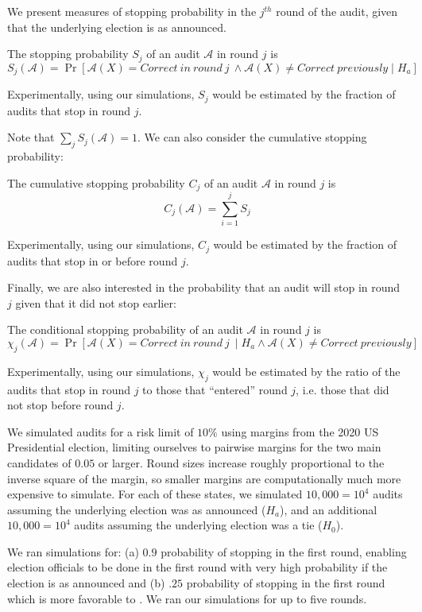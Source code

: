 We present measures of stopping probability in the $j^{th}$ round of the audit, given that the underlying election is as announced.
\begin{definition}
The stopping probability $S_j$ of an audit $\mathcal{A}$ in round $j$ is 
$$S_j(\mathcal{A})=\Pr[\mathcal{A}(X)=Correct ~in~round~j~\land \mathcal{A}(X) \neq Correct ~previously \mid H_a]$$
\end{definition}
Experimentally, using our simulations, $S_j$ would be estimated by the fraction of audits that stop in round $j$. 

Note that $\sum _j S_j(\mathcal{A})=1$. We can also consider the cumulative stopping probability: 
\begin{definition}
The cumulative stopping probability $C_j$ of an audit $\mathcal{A}$ in round $j$ is 
$$C_j(\mathcal{A})= \sum_{i=1}^j S_j$$
\end{definition}
Experimentally, using our simulations, $C_j$ would be estimated by the fraction of audits that stop in or before round $j$. 

Finally, we are also interested in the probability that an audit will stop in round $j$ given that it did not stop earlier: 
\begin{definition}
The conditional stopping probability  of an audit $\mathcal{A}$ in round $j$ is 
$$\chi_j (\mathcal{A})=\Pr[\mathcal{A}(X)=Correct ~in~round~j~\mid H_a \land \mathcal{A}(X) \neq Correct ~previously]$$
\end{definition}
Experimentally, using our simulations, $\chi_j$ would be estimated by the ratio of the audits that stop in round $j$ to those that ``entered'' round $j$, i.e. those that did not stop before round $j$. 

We simulated audits for a risk limit of $10\%$ using margins from the 2020 US Presidential election, limiting ourselves to pairwise margins for the two main candidates of $0.05$ or larger. Round sizes increase roughly proportional to the inverse
square of the margin, so 
smaller margins are computationally much more expensive to simulate.
For each of these states, we simulated 
$10,000=10^4$ audits assuming the underlying election was as announced ($H_a$),  
and an additional $10,000=10^4$ audits assuming the underlying election was a tie ($H_0$). 

We ran simulations for: (a) $0.9$ probability of stopping in the first round, enabling election officials to be done in the first round with very high probability if the election is as announced and (b) $.25$ probability of stopping in the first round which is more favorable to \BRAVO. We ran our simulations for up to five rounds. 

